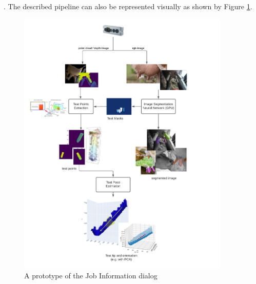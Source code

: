     \lipsum[2]. The described pipeline can also be represented visually as shown by Figure \ref{fig:cow_design}.
    \begin{figure}[!ht]
        \centering
        \includegraphics[width=0.9\textwidth]{images/cow_design.png}
        \caption{A prototype of the Job Information dialog}
        \label{fig:cow_design}
    \end{figure}
    
    

